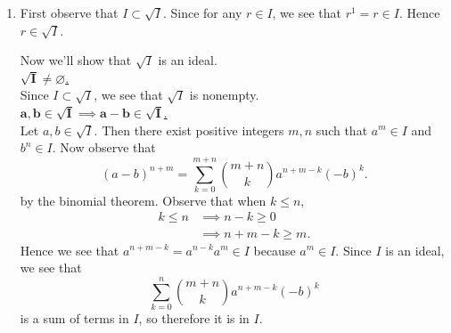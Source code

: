     \begin{prf}
        \begin{enumerate}
            \item First observe that $I \subset \sqrt{I}$. Since for any $r \in I$,
            we see that $r^1 = r \in I$. Hence $r \in \sqrt{I}$. 
        
            Now we'll show that $\sqrt{I}$ is an ideal.\\[1.2ex]
            \noindent\underline{$\bm{\sqrt{I} \ne \varnothing}$.}\\[1.2ex]
            Since $I \subset \sqrt{I}$, we see that $\sqrt{I}$ is nonempty. 
            \\[1.2ex]
            \noindent\underline{$\bm{a, b \in \sqrt{I} \implies a - b \in
            \sqrt{I}}$.}\\[1.2ex]
            Let $a, b \in \sqrt{I}$. Then there exist positive integers $m, n$
            such that $a^m \in I$ and $b^n \in I$. Now observe that 
            \[
                (a -  b)^{n + m} = \sum_{k = 0}^{m + n}\binom{m+n}{k}a^{n + m - k}(-b)^{k}.
            \]
            by the binomial theorem. Observe that when $k \le n$,
            \begin{align*}
                k \le n & \implies n - k \ge 0\\
                & \implies n + m - k \ge m.
            \end{align*}
            Hence we see that $a^{n + m - k} = a^{n - k}a^m \in I$ because
            $a^m \in I$. Since $I$
            is an ideal, we see that 
            \[
                \sum_{k = 0}^{n}\binom{m+n}{k}a^{n + m - k}(-b)^{k}  
            \]
            is a sum of terms in $I$, so therefore it is in $I$. 
        

\end{enumerate}
\end{prf}
